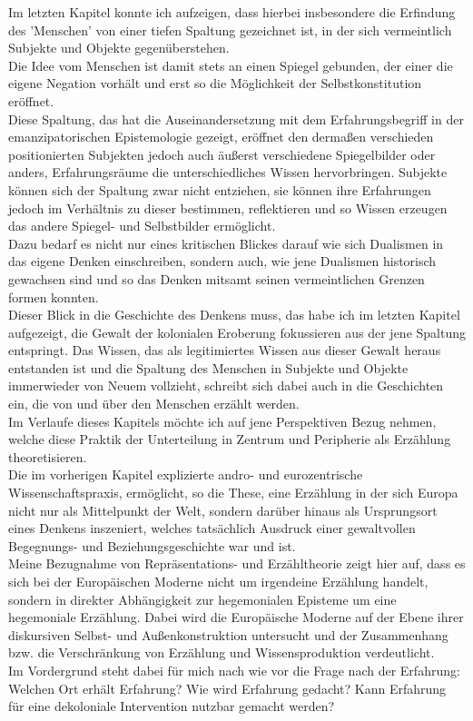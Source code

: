 \noindent Im letzten Kapitel konnte ich aufzeigen, dass hierbei
insbesondere die Erfindung des 'Menschen' von einer tiefen Spaltung gezeichnet
ist, in der sich vermeintlich Subjekte und Objekte gegenüberstehen.\\
Die Idee
vom Menschen ist damit stets an einen Spiegel gebunden, der einer die eigene
Negation vorhält und erst so die Möglichkeit der Selbstkonstitution eröffnet.\\
Diese Spaltung, das hat die Auseinandersetzung mit dem Erfahrungsbegriff in der
emanzipatorischen Epistemologie gezeigt, eröffnet den dermaßen verschieden
positionierten Subjekten jedoch auch äußerst verschiedene Spiegelbilder oder
anders, Erfahrungsräume die unterschiedliches Wissen hervorbringen. Subjekte
können sich der Spaltung zwar nicht entziehen, sie können ihre Erfahrungen
jedoch im Verhältnis zu dieser bestimmen, reflektieren und so Wissen erzeugen
das andere Spiegel- und Selbstbilder ermöglicht. \\
Dazu bedarf es nicht nur eines
kritischen Blickes darauf wie sich Dualismen in das eigene Denken einschreiben,
sondern auch, wie jene Dualismen historisch gewachsen sind und so das Denken
mitsamt seinen vermeintlichen Grenzen formen konnten.\\ 
Dieser Blick in die
Geschichte des Denkens muss, das habe ich im letzten Kapitel aufgezeigt, die
Gewalt der kolonialen Eroberung fokussieren aus der jene Spaltung entspringt.
Das Wissen, das als legitimiertes Wissen aus dieser Gewalt heraus entstanden
ist und die Spaltung des Menschen in Subjekte und Objekte immerwieder von Neuem
vollzieht, schreibt sich dabei auch in die Geschichten ein, die von und über den Menschen erzählt werden.\\

\noindent Im Verlaufe dieses Kapitels möchte ich auf jene Perspektiven Bezug nehmen,
welche diese Praktik der Unterteilung in Zentrum und Peripherie als Erzählung
theoretisieren. \\
Die im vorherigen Kapitel explizierte andro- und eurozentrische
Wissenschaftspraxis, ermöglicht, so die These, eine Erzählung in der sich
Europa nicht nur als Mittelpunkt der Welt, sondern darüber hinaus als
Ursprungsort eines Denkens inszeniert, welches tatsächlich Ausdruck einer
gewaltvollen Begegnungs- und Beziehungsgeschichte war und ist.\\ 

\noindent Meine
Bezugnahme von Repräsentations- und Erzähltheorie zeigt hier auf, dass es sich
bei der Europäischen Moderne nicht um irgendeine Erzählung handelt, sondern in
direkter Abhängigkeit zur hegemonialen Episteme um eine hegemoniale Erzählung.
Dabei wird die Europäische Moderne auf der Ebene ihrer diskursiven Selbst- und
Außenkonstruktion untersucht und der Zusammenhang bzw. die Verschränkung von
Erzählung und Wissensproduktion verdeutlicht.\\
Im Vordergrund steht dabei für
mich nach wie vor die Frage nach der Erfahrung: \\
Welchen Ort erhält Erfahrung?
Wie wird Erfahrung gedacht? Kann Erfahrung für eine dekoloniale Intervention
nutzbar gemacht werden?\\

